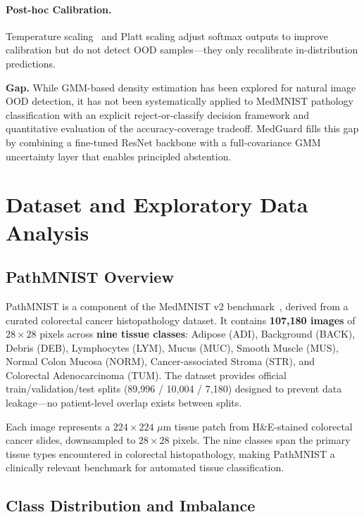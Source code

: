 \documentclass{article}
\begin{document}
\paragraph{Post-hoc Calibration.} Temperature scaling~\citep{guo2017calibration} and Platt scaling adjust softmax outputs to improve calibration but do not detect OOD samples---they only recalibrate in-distribution predictions.

\textbf{Gap.} While GMM-based density estimation has been explored for natural image OOD detection, it has not been systematically applied to MedMNIST pathology classification with an explicit reject-or-classify decision framework and quantitative evaluation of the accuracy-coverage tradeoff. MedGuard fills this gap by combining a fine-tuned ResNet backbone with a full-covariance GMM uncertainty layer that enables principled abstention.

\section{Dataset and Exploratory Data Analysis}
\label{sec:data}

\subsection{PathMNIST Overview}

PathMNIST is a component of the MedMNIST v2 benchmark~\citep{yang2023medmnist}, derived from a curated colorectal cancer histopathology dataset. It contains \textbf{107,180 images} of $28 \times 28$ pixels across \textbf{nine tissue classes}: Adipose (ADI), Background (BACK), Debris (DEB), Lymphocytes (LYM), Mucus (MUC), Smooth Muscle (MUS), Normal Colon Mucosa (NORM), Cancer-associated Stroma (STR), and Colorectal Adenocarcinoma (TUM). The dataset provides official train/validation/test splits (89,996 / 10,004 / 7,180) designed to prevent data leakage---no patient-level overlap exists between splits.

Each image represents a $224 \times 224$ $\mu$m tissue patch from H\&E-stained colorectal cancer slides, downsampled to $28 \times 28$ pixels. The nine classes span the primary tissue types encountered in colorectal histopathology, making PathMNIST a clinically relevant benchmark for automated tissue classification.

\subsection{Class Distribution and Imbalance}
\end{document}
